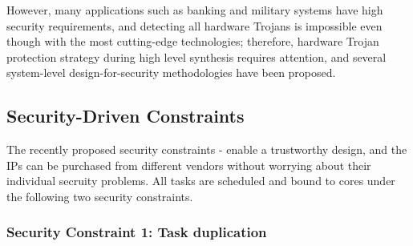 \documentclass[conference]{IEEEtran}
\begin{document}




However, many applications such as banking and military systems have high security requirements, and detecting all hardware Trojans is impossible even though with the most cutting-edge technologies;  therefore, hardware Trojan protection strategy during high level synthesis requires attention, and several system-level design-for-security methodologies have been proposed.


\subsection{Security-Driven Constraints}
\label{subsect:sec}
The recently proposed security constraints \cite{article:JR3}-\cite{article:NW}  enable a trustworthy design, and the IPs can be purchased from different vendors without worrying about their individual secruity problems. All tasks are scheduled and bound to cores under the following two security constraints.%


\subsubsection{\textbf{Security Constraint 1:} Task duplication}
\end{document}
